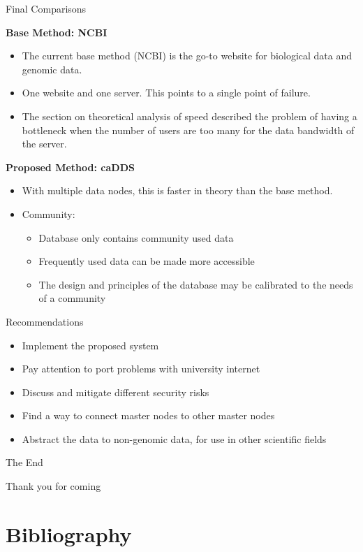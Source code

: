 \documentclass{beamer}
\begin{document}
\begin{frame}{Final Comparisons}
  \begin{block} {\textbf{Base Method: NCBI}}
    \begin{itemize}
        \item The current base method (NCBI) is the go-to website for biological data and genomic data. 
        \item One website and one server. This points to a single point of failure\cite{seqtorr}.
        \item The section on theoretical analysis of speed described the problem of having a bottleneck when the number of users are too many for the data bandwidth of the server. 
    \end{itemize}

  \end{block}
  
    \begin{block} {\textbf{Proposed Method: caDDS}}
    
    \begin{itemize}
        \item With multiple data nodes, this is faster in theory than the base method.
        \item  Community: \begin{itemize}
            \item Database only contains community used data
            \item Frequently used data can be made more accessible
            \item The design and principles of the database may be calibrated to the needs of a community
        \end{itemize}
    \end{itemize}
  \end{block}
\end{frame}


\begin{frame}{Recommendations}
  \begin{itemize}   
    \item Implement the proposed system
    \item Pay attention to port problems with university internet
    \item Discuss and mitigate different security risks
    \item Find a way to connect master nodes to other master nodes
    \item Abstract the data to non-genomic data, for use in other scientific fields
  \end{itemize}
\end{frame}

\begin{frame}
\Huge{\centerline{The End}}
\small{\centerline{Thank you for coming}}
\end{frame}

\section{Bibliography}

\begin{frame}[allowframebreaks]
\printbibliography[heading=none]
\end{frame}
\end{document}
